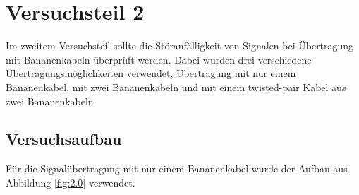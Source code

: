 \documentclass[12pt,a4paper]{article}
\begin{document}
\section{Versuchsteil 2}
Im zweitem Versuchsteil sollte die Störanfälligkeit von Signalen bei Übertragung mit Bananenkabeln überprüft werden. Dabei wurden drei verschiedene Übertragungsmöglichkeiten verwendet, Übertragung mit nur einem Bananenkabel, mit zwei Bananenkabeln und mit einem twisted-pair Kabel aus zwei Bananenkabeln.
\subsection{Versuchsaufbau}
Für die Signalübertragung mit nur einem Bananenkabel wurde der Aufbau aus Abbildung \ref{fig:2.0} verwendet.
\end{document}
